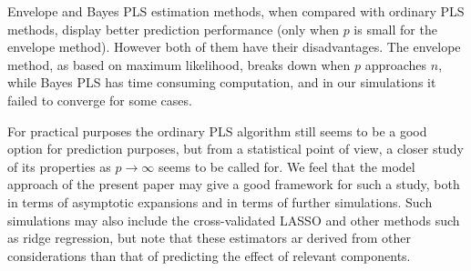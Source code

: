 \documentclass[num-refs]{wiley-article}
\begin{document}
Envelope and Bayes PLS estimation methods, when compared with ordinary PLS methods, display better prediction performance (only when $p$ is small for the envelope method). However both of them have their disadvantages. The envelope method, as based on maximum likelihood, breaks down when $p$ approaches $n$, while Bayes PLS has time consuming computation, and in our simulations it failed to converge for some cases.

For practical purposes the ordinary PLS algorithm still seems to be a good option for prediction purposes, but from a statistical point of view, a closer study of its properties as $p\rightarrow\infty$ seems to be called for. We feel that the model approach of the present paper may give a good framework for such a study, both in terms of asymptotic expansions and in terms of further simulations. Such simulations may also include the cross-validated LASSO and other methods such as ridge regression, but note that these estimators ar derived from other considerations than that of predicting the effect of relevant components.



\end{document}
